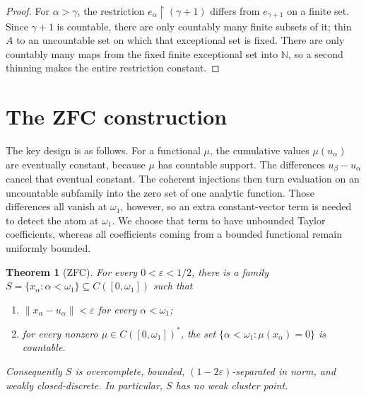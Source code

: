 \documentclass[11pt]{article}
\newtheorem{theorem}{Theorem}
\theoremstyle{remark}
\newcommand{\N}{\mathbb N}
\begin{document}
\begin{proof}
For $\alpha>\gamma$, the restriction
$e_\alpha\!\upharpoonright(\gamma+1)$ differs from $e_{\gamma+1}$ on a finite
set.  Since $\gamma+1$ is countable, there are only countably many finite
subsets of it; thin $A$ to an uncountable set on which that exceptional set is
fixed.  There are only countably many maps from the fixed finite exceptional
set into $\N$, so a second thinning makes the entire restriction constant.
\end{proof}

\section{The ZFC construction}

The key design is as follows.  For a functional $\mu$, the cumulative values
$\mu(u_\alpha)$ are eventually constant, because $\mu$ has countable support.
The differences $u_\beta-u_\alpha$ cancel that eventual constant.  The
coherent injections then turn evaluation on an uncountable subfamily into the
zero set of one analytic function.  Those differences all vanish at
$\omega_1$, however, so an extra constant-vector term is needed to detect the
atom at $\omega_1$.  We choose that term to have unbounded Taylor coefficients,
whereas all coefficients coming from a bounded functional remain uniformly
bounded.

\begin{theorem}[ZFC]\label{thm:main}
For every $0<\varepsilon<1/2$, there is a family
$S=\{x_\alpha:\alpha<\omega_1\}\subseteq C([0,\omega_1])$ such that
\begin{enumerate}[label=\textup{(\roman*)},leftmargin=2.2em]
\item $\|x_\alpha-u_\alpha\|<\varepsilon$ for every $\alpha<\omega_1$;
\item for every nonzero $\mu\in C([0,\omega_1])^*$, the set
      $\{\alpha<\omega_1:\mu(x_\alpha)=0\}$ is countable.
\end{enumerate}
Consequently $S$ is overcomplete, bounded, $(1-2\varepsilon)$-separated in
norm, and weakly closed-discrete.  In particular, $S$ has no weak cluster
point.
\end{theorem}
\end{document}
